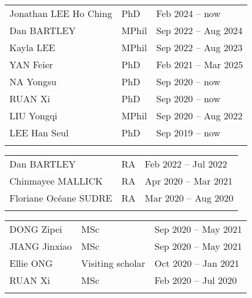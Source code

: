 \documentclass[letterpaper]{article}
\begin{document}
\begin{tabularx}{\textwidth}{XXX}
  Jonathan LEE Ho Ching   & PhD   & Feb 2024 -- now\\
  Dan BARTLEY             & MPhil & Sep 2022 -- Aug 2024\\
  Kayla LEE               & MPhil & Sep 2022 -- Aug 2023\\
  YAN Feier               & PhD   & Feb 2021 -- Mar 2025\\
  NA Yongsu               & PhD   & Sep 2020 -- now\\
  RUAN Xi                 & PhD   & Sep 2020 -- now\\
  LIU Yongqi              & MPhil & Sep 2020 -- Aug 2022\\
  LEE Han Seul            & PhD   & Sep 2019 -- now\\
  \\
\end{tabularx}

\begin{tabularx}{\textwidth}{XXX}
  Dan BARTLEY             & RA    & Feb 2022 -- Jul 2022\\
  Chinmayee MALLICK       & RA    & Apr 2020 -- Mar 2021\\
  Floriane Oc\'eane SUDRE & RA    & Mar 2020 -- Aug 2020\\
  \\
\end{tabularx}

\begin{tabularx}{\textwidth}{XXX}
  DONG Zipei        & MSc               & Sep 2020 -- May 2021\\
  JIANG Jinxiao     & MSc               & Sep 2020 -- May 2021\\
  Ellie ONG         & Visiting scholar  & Oct 2020 -- Jan 2021\\
  RUAN Xi           & MSc               & Feb 2020 -- Jul 2020\\
  \\
\end{tabularx}
  
\end{document}
